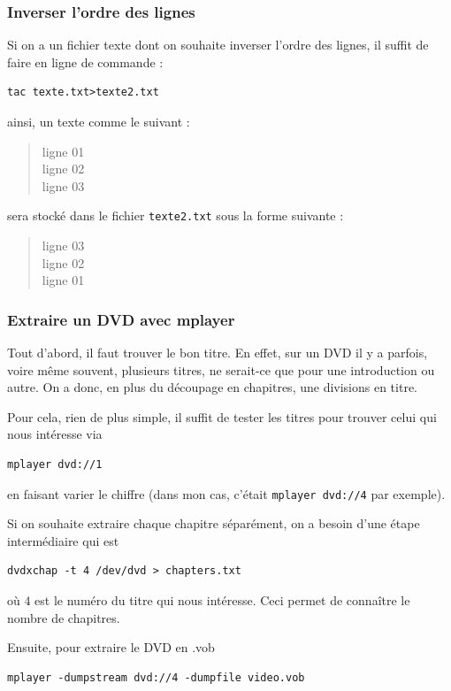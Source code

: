 \documentclass[a4paper,twoside]{article}
\begin{document}
\subsubsection{Inverser l'ordre des lignes}

Si on a un fichier texte dont on souhaite inverser l'ordre des lignes, il suffit de faire en ligne de commande :

\begin{verbatim}
tac texte.txt>texte2.txt
\end{verbatim}
ainsi, un texte comme le suivant :
\begin{quote}
ligne 01\\
ligne 02\\
ligne 03
\end{quote}

sera stocké dans le fichier \texttt{texte2.txt} sous la forme suivante :

\begin{quote}
ligne 03\\
ligne 02\\
ligne 01
\end{quote}

\subsubsection{Extraire un DVD avec mplayer}
Tout d'abord, il faut trouver le bon titre. En effet, sur un DVD il y a parfois, voire même souvent, plusieurs titres, ne serait-ce que pour une introduction ou autre. On a donc, en plus du découpage en chapitres, une divisions en titre.

Pour cela, rien de plus simple, il suffit de tester les titres pour trouver celui qui nous intéresse via
\begin{verbatim}
mplayer dvd://1
\end{verbatim}
en faisant varier le chiffre (dans mon cas, c'était \verb|mplayer dvd://4| par exemple).

\bigskip

Si on souhaite extraire chaque chapitre séparément, on a besoin d'une étape intermédiaire qui est
\begin{verbatim}
dvdxchap -t 4 /dev/dvd > chapters.txt
\end{verbatim}
où $4$ est le numéro du titre qui nous intéresse. Ceci permet de connaître le nombre de chapitres.

Ensuite, pour extraire le DVD en .vob
\begin{verbatim}
mplayer -dumpstream dvd://4 -dumpfile video.vob
\end{verbatim}
\end{document}

